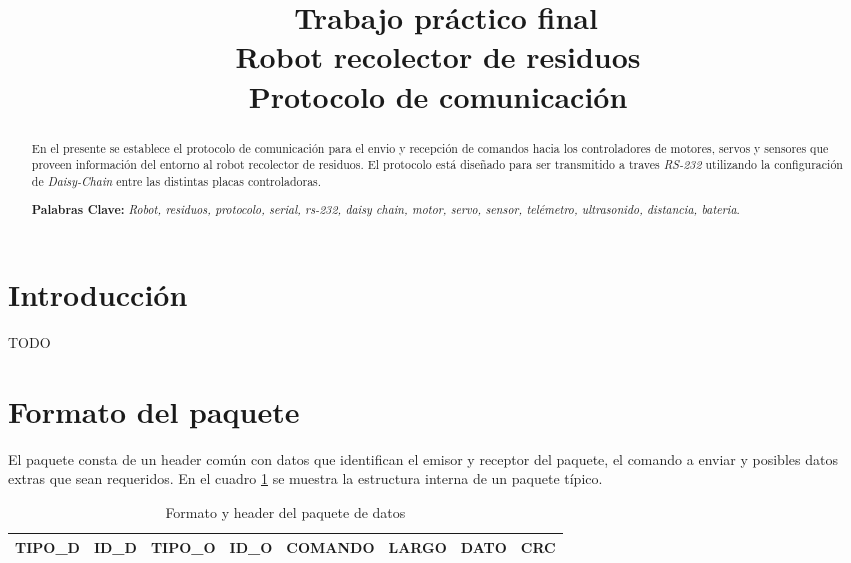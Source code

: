 \documentclass[a4paper,10pt]{article}
\begin{document}
\title{{\ Trabajo pr\'actico final \\ Robot recolector de residuos \\ Protocolo de comunicaci\'on}}



\maketitle

\begin{abstract}
En el presente se establece el protocolo de comunicaci\'on para el envio y recepci\'on de comandos hacia los controladores
de motores, servos y sensores que proveen informaci\'on del entorno al robot recolector de residuos. El protocolo est\'a dise\~nado
para ser transmitido a traves \emph{RS-232} utilizando la configuraci\'on de \emph{Daisy-Chain} entre las distintas placas controladoras.

\textbf{Palabras Clave: }\emph{Robot, residuos, protocolo, serial, rs-232, daisy chain, motor, servo, sensor, tel\'emetro, ultrasonido, distancia, bateria}.
\end{abstract}



\section{Introducci\'on}
\label{introduccion}

TODO

\section{Formato del paquete}
\label{formato_paquete}


El paquete consta de un header com\'un con datos que identifican el emisor y receptor del paquete, el comando a enviar y posibles datos extras que sean requeridos.
En el cuadro \ref{formato_paquete_tabla} se muestra la estructura interna de un paquete t\'ipico.

\begin{table}[h]
\begin{center}
\begin{tabular}{|c|c|c|c|c|c|c|c|}
\hline
TIPO\_D & ID\_D & TIPO\_O & ID\_O & COMANDO & LARGO & DATO & CRC \\
\hline
\end{tabular}
\caption{Formato y header del paquete de datos}
\label{formato_paquete_tabla}
\end{center}
\end{table}
\end{document}
